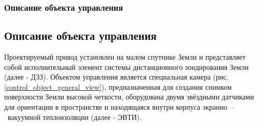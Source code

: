 \ifdefined\DIPLOMA
    \subsubsection{Описание объекта управления}
    \label{sec_controlled_object_desc}
\else
    \subsection{Описание объекта управления}
\fi

Проектируемый привод установлен на малом спутнике Земли и представляет собой
исполнительный элемент системы дистанционного зондирования Земли (далее - ДЗЗ).
Объектом управления является специальная камера (рис. \ref{control_object_general_view}),
предназначенная для создания снимком поверхности Земли высокой четкости,
оборудована двумя звёздными датчиками для ориентации в пространстве и
находящаяся внутри корпуса экранно~--~вакуумной теплоизоляции (далее - ЭВТИ).

